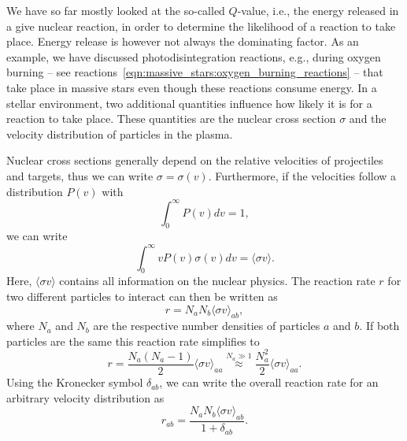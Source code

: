 We have so far mostly looked at the so-called $Q$-value, i.e., the energy released in a give nuclear reaction, in order to determine the likelihood of a reaction to take place. Energy release is however not always the dominating factor. As an example, we have discussed photodisintegration reactions, e.g., during oxygen burning -- see reactions~\eqref{eqn:massive_stars:oxygen_burning_reactions} -- that take place in massive stars even though these reactions consume energy. In a stellar environment, two additional quantities influence how likely it is for a reaction to take place. These quantities are the nuclear cross section $\sigma$ and the velocity distribution of particles in the plasma. 

Nuclear cross sections generally depend on the relative velocities of projectiles and targets, thus we can write $\sigma = \sigma(v)$. Furthermore, if the velocities follow a distribution $P(v)$ with
\begin{equation}
    \int_0^\infty P(v) dv = 1,
\end{equation}
we can write
\begin{equation}
    \int_0^\infty v P(v) \sigma(v) dv = \langle \sigma v \rangle.
\end{equation}
Here, $\langle \sigma v \rangle$ contains all information on the nuclear physics. The reaction rate $r$ for two different particles to interact can then be written as
\begin{equation}
    r = N_a N_b \langle \sigma v \rangle_{ab},
\end{equation}
where $N_a$ and $N_b$ are the respective number densities of particles $a$ and $b$. If both particles are the same this reaction rate simplifies to
\begin{equation}
    r = \frac{N_a (N_a - 1)}{2}\langle\sigma v\rangle_{aa} \overset{N_a\gg1}{\approx} \frac{N_a^2}{2}\langle\sigma v \rangle_{aa}.
\end{equation}
Using the Kronecker symbol $\delta_{ab}$, we can write the overall reaction rate for an arbitrary velocity distribution as
\begin{equation}
    r_{ab} = \frac{N_a N_b \langle\sigma v\rangle_{ab}}{1 + \delta_{ab}}.
\end{equation}

